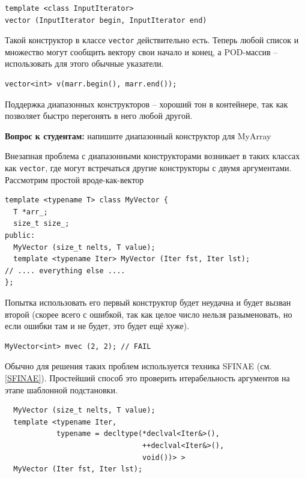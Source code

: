 \documentclass[a4paper,12pt,oneside]{article}
\newif\ifanswers
\begin{document}
\begin{lstlisting}
template <class InputIterator>
vector (InputIterator begin, InputIterator end) 
\end{lstlisting}

Такой конструктор в классе \lstinline!vector! действительно есть. Теперь любой список и множество могут сообщить вектору свои начало и конец, а POD-массив -- использовать для этого обычные указатели.

\begin{lstlisting}
vector<int> v(marr.begin(), marr.end());
\end{lstlisting}

Поддержка диапазонных конструкторов -- хороший тон в контейнере, так как позволяет быстро перегонять в него любой другой.

\textbf{Вопрос к студентам:} напишите диапазонный конструктор для MyArray

\ifanswers
\begin{lstlisting}
template <typename Iter> MyArray (Iter fst, Iter lst) {
  int idx = 0;
  for (auto it = fst; it != lst; ++i) {
    assert (idx < S);
    arr[idx++] = *it;
  }
}
\end{lstlisting}
\fi

Внезапная проблема с диапазонными конструкторами возникает в таких классах как \lstinline!vector!, где могут встречаться другие конструкторы с двумя аргументами. Рассмотрим простой вроде-как-вектор

\begin{lstlisting}
template <typename T> class MyVector {
  T *arr_;
  size_t size_;
public:
  MyVector (size_t nelts, T value);
  template <typename Iter> MyVector (Iter fst, Iter lst);
// .... everything else ....
};
\end{lstlisting}

Попытка использовать его первый конструктор будет неудачна и будет вызван второй (скорее всего с ошибкой, так как целое число нельзя разыменовать, но если ошибки там и не будет, это будет ещё хуже).

\begin{lstlisting}
MyVector<int> mvec (2, 2); // FAIL
\end{lstlisting}

Обычно для решения таких проблем используется техника SFINAE (см. \ref{SFINAE}). Простейший способ это проверить итерабельность аргументов на этапе шаблонной подстановки.

\begin{lstlisting}
  MyVector (size_t nelts, T value);
  template <typename Iter, 
            typename = decltype(*declval<Iter&>(),
                                ++declval<Iter&>(), 
                                void())> >
  MyVector (Iter fst, Iter lst);
\end{lstlisting}
\end{document}
